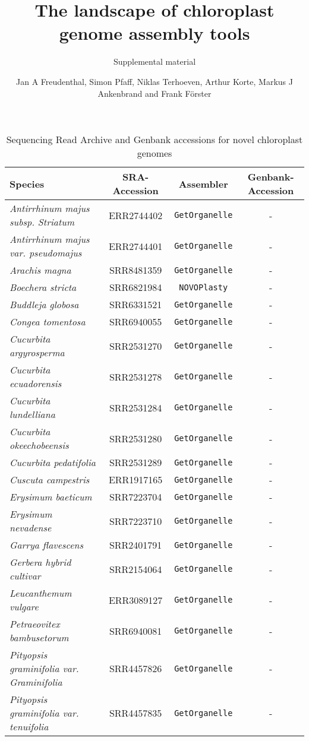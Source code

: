 \documentclass[oneside,10pt,A4]{scrartcl}
\newcommand{\formatprogramnames}[1]{\texttt{#1}}
\newcommand{\np}{\formatprogramnames{NOVOPlasty}}
\newcommand{\go}{\formatprogramnames{GetOrganelle}}
\begin{document}
\title{The landscape of chloroplast genome assembly
tools}
\subtitle{Supplemental material}
\author{\parbox{\textwidth}{\centering{}Jan A Freudenthal, Simon Pfaff, Niklas Terhoeven, Arthur Korte, Markus J Ankenbrand and Frank Förster}}
\date{}
\maketitle
\listoftables

\begin{table}[ht]
\caption{Sequencing Read Archive and Genbank accessions for novel chloroplast genomes}
\label{tab:accessions_suppl}
\centering
\begin{tabular}{p{4.5cm}ccc}\toprule
Species & SRA-Accession & Assembler & Genbank-Accession \\\midrule
\emph{Antirrhinum majus \emph{subsp.} Striatum} & ERR2744402 & \go{} & - \\
\emph{Antirrhinum majus \emph{var.} pseudomajus} & ERR2744401 & \go{} & - \\
\emph{Arachis magna} & SRR8481359 & \go{} & - \\
\emph{Boechera stricta} & SRR6821984 & \np{} & - \\
\emph{Buddleja globosa} & SRR6331521 & \go{} & - \\
\emph{Congea tomentosa} & SRR6940055 & \go{} & - \\
\emph{Cucurbita argyrosperma} & SRR2531270 & \go{} & - \\
\emph{Cucurbita ecuadorensis} & SRR2531278 & \go{} & - \\
\emph{Cucurbita lundelliana} & SRR2531284 & \go{} & - \\
\emph{Cucurbita okeechobeensis} & SRR2531280 & \go{} & - \\
\emph{Cucurbita pedatifolia} & SRR2531289 & \go{} & - \\
\emph{Cuscuta campestris} & ERR1917165 & \go{} & - \\
\emph{Erysimum baeticum} & SRR7223704 & \go{} & - \\
\emph{Erysimum nevadense} & SRR7223710 & \go{} & - \\
\emph{Garrya flavescens} & SRR2401791 & \go{} & - \\
\emph{Gerbera hybrid cultivar} & SRR2154064 & \go{} & - \\
\emph{Leucanthemum vulgare} & ERR3089127 & \go{} & - \\
\emph{Petraeovitex bambusetorum} & SRR6940081 & \go{} & - \\
\emph{Pityopsis graminifolia \emph{var.} Graminifolia} & SRR4457826 & \go{} & - \\
\emph{Pityopsis graminifolia \emph{var.} tenuifolia} & SRR4457835 & \go{} & - \\
\bottomrule
\end{tabular}
\end{table}
\end{document}
